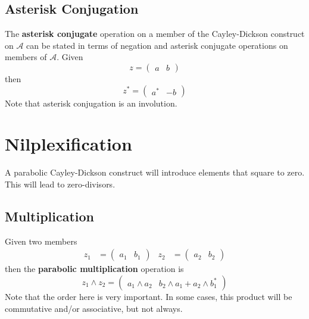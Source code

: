 \subsection{Asterisk Conjugation}
The \textbf{asterisk conjugate} operation on a member of the Cayley-Dickson construct on $\mathcal{A}$ can be stated in terms of negation and asterisk conjugate operations on members of $\mathcal{A}$. Given
\begin{equation}
    z = \begin{pmatrix}
        a & b
    \end{pmatrix}
\end{equation}
then
\begin{equation}
    z^{\ast} = \begin{pmatrix}
        a^{\ast} & -b
    \end{pmatrix}
\end{equation}
Note that asterisk conjugation is an involution.
\section{Nilplexification}
A parabolic Cayley-Dickson construct will introduce elements that square to zero. This will lead to zero-divisors.
\subsection{Multiplication}
Given two members
\begin{align*}
    z_{1} &= \begin{pmatrix}
        a_{1} & b_{1}
    \end{pmatrix} &
    z_{2} &= \begin{pmatrix}
        a_{2} & b_{2}
    \end{pmatrix}
\end{align*}
then the \textbf{parabolic multiplication} operation is
\begin{equation}
    z_{1} \wedge z_{2} = \begin{pmatrix}
        a_{1} \wedge a_{2} & b_{2} \wedge a_{1} + a_{2} \wedge b_{1}^{\ast}
    \end{pmatrix}
\end{equation}
Note that the order here is very important. In some cases, this product will be commutative and/or associative, but not always.
